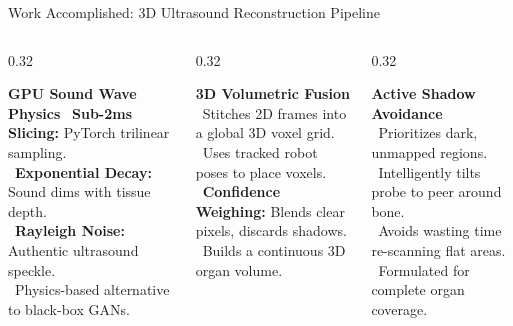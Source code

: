 \documentclass{if-beamer}
\begin{document}
\begin{frame}{Work Accomplished: 3D Ultrasound Reconstruction Pipeline}
    \vspace{0.2cm}
    \begin{columns}[T]
        \begin{column}{0.32\textwidth}
            \begin{block}{\centering \textbf{GPU Sound Wave Physics}}
                \footnotesize
                \textbullet\ \textbf{Sub-2ms Slicing:} PyTorch trilinear sampling.\\
                \textbullet\ \textbf{Exponential Decay:} Sound dims with tissue depth.\\
                \textbullet\ \textbf{Rayleigh Noise:} Authentic ultrasound speckle.\\
                \textbullet\ Physics-based alternative to black-box GANs.
            \end{block}
        \end{column}
        \begin{column}{0.32\textwidth}
            \begin{block}{\centering \textbf{3D Volumetric Fusion}}
                \footnotesize
                \textbullet\ Stitches 2D frames into a global 3D voxel grid.\\
                \textbullet\ Uses tracked robot poses to place voxels.\\
                \textbullet\ \textbf{Confidence Weighing:} Blends clear pixels, discards shadows.\\
                \textbullet\ Builds a continuous 3D organ volume.
            \end{block}
        \end{column}
        \begin{column}{0.32\textwidth}
            \begin{block}{\centering \textbf{Active Shadow Avoidance}}
                \footnotesize
                \textbullet\ Prioritizes dark, unmapped regions.\\
                \textbullet\ Intelligently tilts probe to peer around bone.\\
                \textbullet\ Avoids wasting time re-scanning flat areas.\\
                \textbullet\ Formulated for complete organ coverage.
            \end{block}
        \end{column}
    \end{columns}
\end{frame}
\end{document}
